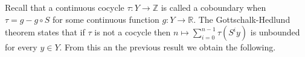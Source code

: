 \documentclass[a4paper,oneside]{amsart}
\renewcommand{\(}{\begin{dmath*}}
\renewcommand{\)}{\end{dmath*}}
\theoremstyle{definition}
\newcommand{\N}{\mathbb{N}}
\newcommand{\R}{\mathbb{R}}
\newcommand{\Z}{\mathbb{Z}}
\newcommand{\spa}{\operatorname{spa}}
\begin{document}

Recall that a continuous cocycle $\tau\colon Y\to\Z$ is called a coboundary when  $\tau=g-g\circ S$ for some continuous function $g\colon Y\to\R$. The  Gottschalk-Hedlund theorem \cite[Theorem 2.9.4]{katok_introduction_1995} states that if $\tau$ is not a cocycle then  $n\mapsto\sum_{i=0}^{n-1}\tau(S^iy)$ is unbounded for every $y\in Y$. From this an the previous result we obtain the following. 
\end{document}
